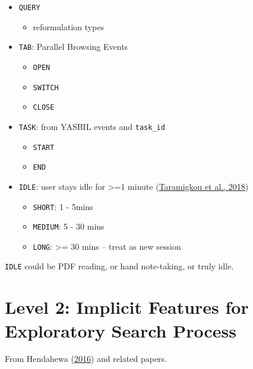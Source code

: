 \documentclass[letterpaper, nobind]{templates/ociamthesis}
\providecommand{\tightlist}{%
  \setlength{\itemsep}{0pt}\setlength{\parskip}{0pt}}
\begin{document}
\begin{itemize}
\tightlist
\item
  \texttt{QUERY}

  \begin{itemize}
  \tightlist
  \item
    reformulation types
  \end{itemize}
\item
  \texttt{TAB}: Parallel Browsing Events

  \begin{itemize}
  \tightlist
  \item
    \texttt{OPEN}
  \item
    \texttt{SWITCH}
  \item
    \texttt{CLOSE}
  \end{itemize}
\item
  \texttt{TASK}: from YASBIL events and \texttt{task\_id}

  \begin{itemize}
  \tightlist
  \item
    \texttt{START}
  \item
    \texttt{END}
  \end{itemize}
\item
  \texttt{IDLE}: user stays idle for \textgreater=1 minute (\protect\hyperlink{ref-taramigkou2018leveraging}{Taramigkou et al., 2018})

  \begin{itemize}
  \tightlist
  \item
    \texttt{SHORT}: 1 - 5mins
  \item
    \texttt{MEDIUM}: 5 - 30 mins
  \item
    \texttt{LONG}: \textgreater= 30 mins -- treat as new session
  \end{itemize}
\end{itemize}

\texttt{IDLE} could be PDF reading, or hand note-taking, or truly idle.

\hypertarget{level-2-implicit-features-for-exploratory-search-process}{%
\section{Level 2: Implicit Features for Exploratory Search Process}\label{level-2-implicit-features-for-exploratory-search-process}}

From Hendahewa (\protect\hyperlink{ref-hendahewa2016implicit}{2016}) and related papers.
\end{document}
